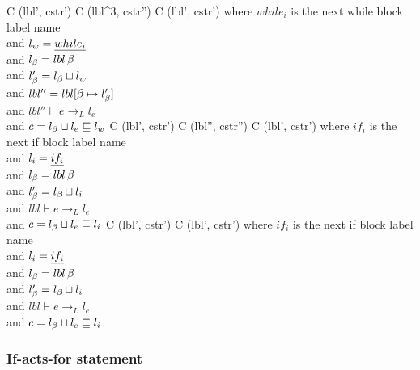 \begin{trules}
        { {C} {(lbl', cstr')} }
        { {C} {(lbl^3, cstr'')} \;
          {C} {(lbl', cstr')} }
        {where $while_i$ is the next while block label name\\
          and $l_w = \underline{while_i}$\\
          and $l_\beta = lbl \, \beta$\\
          and $l_\beta' = l_\beta \sqcup l_w$\\
          and $lbl'' = lbl[\beta \mapsto l_\beta']$\\
          and $lbl'' \vdash e \rightarrow_L l_e$\\
          and $c = l_\beta \sqcup l_e \sqsubseteq l_w$}
        { {C} {(lbl', cstr')}}
        { {C} {(lbl'', cstr'')} \;
          {C} {(lbl', cstr')} }
        {where $if_i$ is the next if block label name\\
          and $l_i = \underline{if_i}$\\
          and $l_\beta = lbl \, \beta$\\
          and $l_\beta' = l_\beta \sqcup l_i$\\
          and $lbl \vdash e \rightarrow_L l_e$\\
          and $c = l_\beta \sqcup l_e \sqsubseteq l_i$}
        { {C} {(lbl', cstr')}}
        {
         { {C} {(lbl', cstr')} }}
        {where $if_i$ is the next if block label name\\
          and $l_i = \underline{if_i}$\\
          and $l_\beta = lbl \, \beta$\\
          and $l_\beta' = l_\beta \sqcup l_i$\\
          and $lbl \vdash e \rightarrow_L l_e$\\
          and $c = l_\beta \sqcup l_e \sqsubseteq l_i$}
\end{trules}

\subsubsection{If-acts-for statement}


